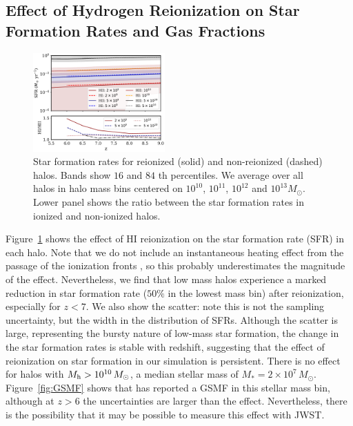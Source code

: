 \documentclass[fleqn,usenatbib]{mnras}
\def\msun{\, M_{\odot}}
\begin{document}
\subsection{Effect of Hydrogen Reionization on Star Formation Rates and Gas Fractions}
\label{sec:sfrreion}

\begin{figure}
\centering
  \includegraphics[width=0.45\textwidth]{plots/avg_sfr_reion.pdf}
  \caption{Star formation rates for reionized (solid) and non-reionized (dashed) halos. Bands show $16$ and $84$ th percentiles. We average over all halos in halo mass bins centered on $10^{10}$, $10^{11}$, $10^{12}$ and $10^{13} M_\odot$. Lower panel shows the ratio between the star formation rates in ionized and non-ionized halos. }
  \label{fig:avgsfr_reion}
\end{figure}

Figure~\ref{fig:avgsfr_reion} shows the effect of HI reionization on the star formation rate (SFR) in each halo. Note that we do not include an instantaneous heating effect from the passage of the ionization fronts \citep{2019ApJ...874..154D}, so this probably underestimates the magnitude of the effect. Nevertheless, we find that low mass halos experience a marked reduction in star formation rate ($50\%$ in the lowest mass bin) after reionization, especially for $z<7$. We also show the scatter: note this is not the sampling uncertainty, but the width in the distribution of SFRs. Although the scatter is large, representing the bursty nature of low-mass star formation, the change in the star formation rates is stable with redshift, suggesting that the effect of reionization on star formation in our simulation is persistent. There is no effect for halos with $M_{\rm h} > 10^{10} \msun$, a median stellar mass of $M_* = 2 \times 10^7 \msun$. Figure~\ref{fig:GSMF} shows that \cite{Song2016} has reported a GSMF in this stellar mass bin, although at $z > 6$ the uncertainties are larger than the effect. Nevertheless, there is the possibility that it may be possible to measure this effect with JWST.
\end{document}
